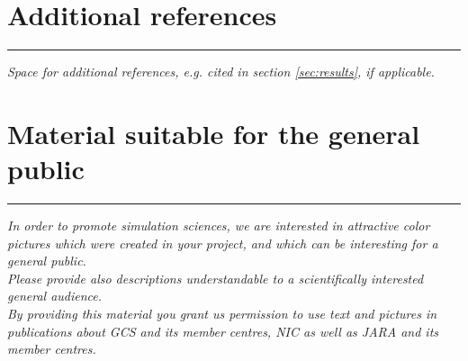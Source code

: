 \documentclass [a4paper, 11pt]{article}
\begin{document}
\section{Additional references}\label{sec:addref}
\rule{\textwidth}{0.4pt}
\textit{Space for additional references, e.g. cited in section \ref{sec:results}, if applicable.}

\section{Material suitable for the general public}
\rule{\textwidth}{0.4pt}
\textit{In order to promote simulation sciences, we are interested in attractive color pictures which were created in your project, and which can be interesting for a general public.} \\

\textit{Please provide also descriptions understandable to a scientifically interested general audience.}\\

\textit{By providing this material you grant us permission to use text and pictures in publications about GCS and its member centres, NIC as well as JARA and its member centres.}
\end{document}
